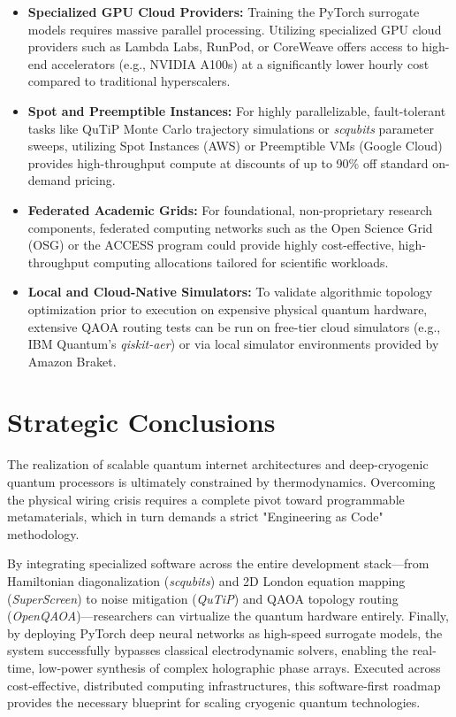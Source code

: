 \documentclass[11pt, a4paper]{article}
\begin{document}
\begin{itemize}
    \item \textbf{Specialized GPU Cloud Providers:} Training the PyTorch surrogate models requires massive parallel processing. Utilizing specialized GPU cloud providers such as Lambda Labs, RunPod, or CoreWeave offers access to high-end accelerators (e.g., NVIDIA A100s) at a significantly lower hourly cost compared to traditional hyperscalers.
    \item \textbf{Spot and Preemptible Instances:} For highly parallelizable, fault-tolerant tasks like QuTiP Monte Carlo trajectory simulations or \textit{scqubits} parameter sweeps, utilizing Spot Instances (AWS) or Preemptible VMs (Google Cloud) provides high-throughput compute at discounts of up to 90\% off standard on-demand pricing.
    \item \textbf{Federated Academic Grids:} For foundational, non-proprietary research components, federated computing networks such as the Open Science Grid (OSG) or the ACCESS program could provide highly cost-effective, high-throughput computing allocations tailored for scientific workloads.
    \item \textbf{Local and Cloud-Native Simulators:} To validate algorithmic topology optimization prior to execution on expensive physical quantum hardware, extensive QAOA routing tests can be run on free-tier cloud simulators (e.g., IBM Quantum's \textit{qiskit-aer}) or via local simulator environments provided by Amazon Braket.
\end{itemize}

\section{Strategic Conclusions}

The realization of scalable quantum internet architectures and deep-cryogenic quantum processors is ultimately constrained by thermodynamics. Overcoming the physical wiring crisis requires a complete pivot toward programmable metamaterials, which in turn demands a strict "Engineering as Code" methodology.

By integrating specialized software across the entire development stack---from Hamiltonian diagonalization (\textit{scqubits}) and 2D London equation mapping (\textit{SuperScreen}) to noise mitigation (\textit{QuTiP}) and QAOA topology routing (\textit{OpenQAOA})---researchers can virtualize the quantum hardware entirely. Finally, by deploying PyTorch deep neural networks as high-speed surrogate models, the system successfully bypasses classical electrodynamic solvers, enabling the real-time, low-power synthesis of complex holographic phase arrays. Executed across cost-effective, distributed computing infrastructures, this software-first roadmap provides the necessary blueprint for scaling cryogenic quantum technologies.
\end{document}
